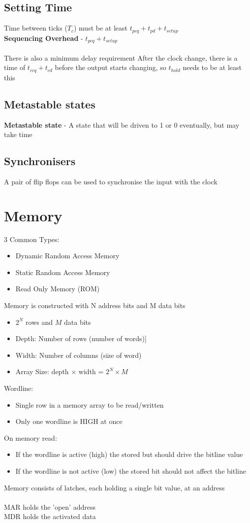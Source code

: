 \documentclass{article}[18pt]
\begin{document}
\subsection{Setting Time}
Time between ticks ($T_c$) must be at least $t_{pcq}+t_{pd}+t_{setup}$\\
\textbf{Sequencing Overhead} - $t_{pcq}+t_{setup}$\\
\\
There is also a minimum delay requirement
After the clock change, there is a time of $t_{ccq}+t_{cd}$ before the output starts changing, so $t_{hold}$ needs to be at least this
\subsection{Metastable states}
\textbf{Metastable state} - A state that will be driven to 1 or 0 eventually, but may take time
\subsection{Synchronisers}
A pair of flip flops can be used to synchronise the input with the clock
\section{Memory}
3 Common Types:
\begin{itemize}
	\item Dynamic Random Access Memory
	\item Static Random Access Memory
	\item Read Only Memory (ROM)
\end{itemize}
Memory is constructed with N address bits and M data bits
\begin{itemize}
	\item $2^N$ rows and $M$ data bits
	\item Depth: Number of rows (number of words)]
	\item Width: Number of columns (size of word)
	\item Array Size: depth $\times$ width = $2^N\times M$
\end{itemize}
Wordline:
\begin{itemize}
	\item Single row in a memory array to be read/written
	\item Only one wordline is HIGH at once
\end{itemize}
On memory read:
\begin{itemize}
	\item If the wordline is active (high) the stored but should drive the bitline value
	\item If the wordline is not active (low) the stored bit should not affect the bitline
\end{itemize}
Memory consists of latches, each holding a single bit value, at an address\\
\\
MAR holds the 'open' address\\
MDR holds the activated data
\end{document}

